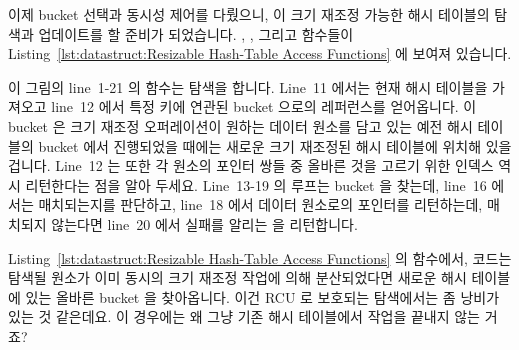 이제 bucket 선택과 동시성 제어를 다뤘으니, 이 크기 재조정 가능한 해시 테이블의
탐색과 업데이트를 할 준비가 되었습니다.
, , 그리고  함수들이
Listing~\ref{lst:datastruct:Resizable Hash-Table Access Functions} 에 보여져
있습니다.

이 그림의 line~1-21 의  함수는 탐색을 합니다.
Line~11 에서는 현재 해시 테이블을 가져오고 line~12 에서 특정 키에 연관된 bucket
으로의 레퍼런스를 얻어옵니다.
이 bucket 은 크기 재조정 오퍼레이션이 원하는 데이터 원소를 담고 있는 예전 해시
테이블의 bucket 에서 진행되었을 때에는 새로운 크기 재조정된 해시 테이블에
위치해 있을 겁니다.
Line~12 는 또한 각 원소의 포인터 쌍들 중 올바른 것을 고르기 위한 인덱스 역시
리턴한다는 점을 알아 두세요.
Line~13-19 의 루프는 bucket 을 찾는데, line~16 에서는 매치되는지를 판단하고,
line~18 에서 데이터 원소로의 포인터를 리턴하는데, 매치되지 않는다면 line~20
에서 실패를 알리는  을 리턴합니다.

\QuickQuiz{}
	Listing~\ref{lst:datastruct:Resizable Hash-Table Access Functions} 의
	 함수에서, 코드는 탐색될 원소가 이미 동시의 크기
	재조정 작업에 의해 분산되었다면 새로운 해시 테이블에 있는 올바른 bucket
	을 찾아옵니다.
	이건 RCU 로 보호되는 탐색에서는 좀 낭비가 있는 것 같은데요.
	이 경우에는 왜 그냥 기존 해시 테이블에서 작업을 끝내지 않는 거죠?
	\iffalse

